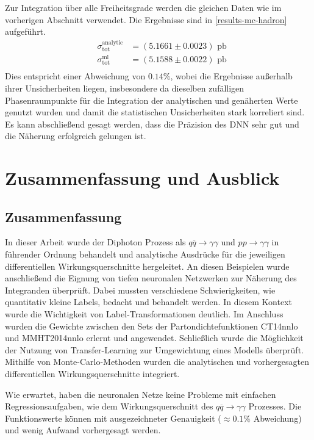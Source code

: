 Zur Integration über alle Freiheitsgrade werden die gleichen Daten wie im vorherigen Abschnitt verwendet. Die Ergebnisse sind in \textsf{\autoref{results-mc-hadron}} aufgeführt.
\begin{equation}
\label{results-mc-hadron}
\begin{aligned}
&\sigma_{\text{tot}}^{\text{analytic}}&=  (5.1661 \pm 0.0023) \text{ pb}\\
&\sigma_{\text{tot}}^{\text{ml}} &= (5.1588 \pm 0.0022) \text{ pb} \\
\end{aligned}
\end{equation}
Dies entspricht einer Abweichung von $0.14\%$, wobei die Ergebnisse außerhalb ihrer Unsicherheiten liegen, insbesondere da dieselben zufälligen Phasenraumpunkte für die Integration der analytischen und genäherten Werte genutzt wurden und damit die statistischen Unsicherheiten stark korreliert sind. Es kann abschließend gesagt werden, dass die Präzision des DNN sehr gut und die Näherung erfolgreich gelungen ist.   
\chapter{Zusammenfassung und Ausblick}
\label{5}
\section{Zusammenfassung}
In dieser Arbeit wurde der Diphoton Prozess als $q\overline{q} \rightarrow \gamma \gamma$ und $pp \rightarrow \gamma \gamma$ in führender Ordnung behandelt und analytische Ausdrücke für die jeweiligen differentiellen Wirkungsquerschnitte hergeleitet. An diesen Beispielen wurde anschließend die Eignung von tiefen neuronalen Netzwerken zur Näherung des Integranden überprüft. Dabei mussten verschiedene Schwierigkeiten, wie quantitativ kleine Labels, bedacht und behandelt werden. In diesem Kontext wurde die Wichtigkeit von Label-Transformationen deutlich. Im Anschluss wurden die Gewichte zwischen den Sets der Partondichtefunktionen CT14nnlo und MMHT2014nnlo erlernt und angewendet. Schließlich wurde die Möglichkeit der Nutzung von Transfer-Learning zur Umgewichtung eines Modells überprüft. Mithilfe von Monte-Carlo-Methoden wurden die analytischen und vorhergesagten differentiellen Wirkungsquerschnitte integriert.

Wie erwartet, haben die neuronalen Netze keine Probleme mit einfachen Regressionsaufgaben, wie dem Wirkungsquerschnitt des $q\overline{q} \rightarrow \gamma \gamma$ Prozesses. Die Funktionswerte können mit ausgezeichneter Genauigkeit ($\approx 0.1\%$ Abweichung) und wenig Aufwand vorhergesagt werden.


